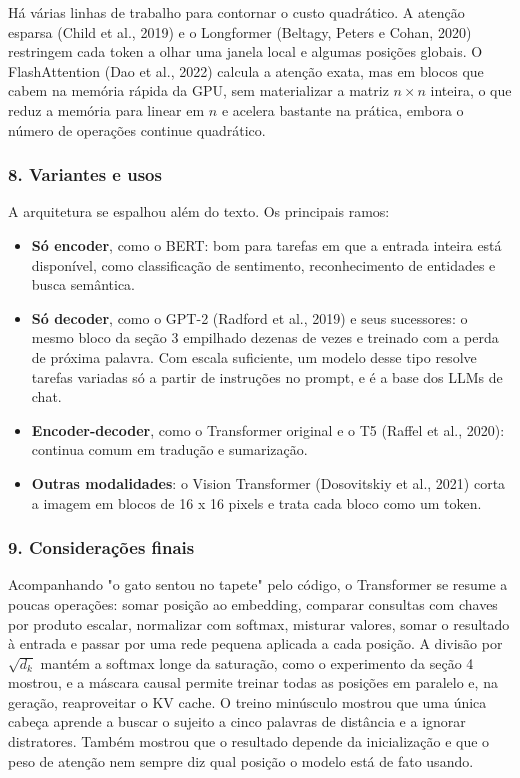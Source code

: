 \documentclass[12pt, a4paper]{article}
\providecommand{\tightlist}{%
  \setlength{\itemsep}{0pt}\setlength{\parskip}{0pt}}
\begin{document}
Há várias linhas de trabalho para contornar o custo quadrático. A atenção esparsa (Child et al., 2019) e o Longformer (Beltagy, Peters e Cohan, 2020) restringem cada token a olhar uma janela local e algumas posições globais. O FlashAttention (Dao et al., 2022) calcula a atenção exata, mas em blocos que cabem na memória rápida da GPU, sem materializar a matriz \(n \times n\) inteira, o que reduz a memória para linear em \(n\) e acelera bastante na prática, embora o número de operações continue quadrático.

\subsubsection{8. Variantes e usos}\label{8-variantes-e-usos}

A arquitetura se espalhou além do texto. Os principais ramos:

\begin{itemize}
\tightlist
\item
  \textbf{Só encoder}, como o BERT: bom para tarefas em que a entrada inteira está disponível, como classificação de sentimento, reconhecimento de entidades e busca semântica.
\item
  \textbf{Só decoder}, como o GPT-2 (Radford et al., 2019) e seus sucessores: o mesmo bloco da seção 3 empilhado dezenas de vezes e treinado com a perda de próxima palavra. Com escala suficiente, um modelo desse tipo resolve tarefas variadas só a partir de instruções no prompt, e é a base dos LLMs de chat.
\item
  \textbf{Encoder-decoder}, como o Transformer original e o T5 (Raffel et al., 2020): continua comum em tradução e sumarização.
\item
  \textbf{Outras modalidades}: o Vision Transformer (Dosovitskiy et al., 2021) corta a imagem em blocos de 16 x 16 pixels e trata cada bloco como um token.
\end{itemize}

\subsubsection{9. Considerações finais}\label{9-considerauxe7uxf5es-finais}

Acompanhando "o gato sentou no tapete" pelo código, o Transformer se resume a poucas operações: somar posição ao embedding, comparar consultas com chaves por produto escalar, normalizar com softmax, misturar valores, somar o resultado à entrada e passar por uma rede pequena aplicada a cada posição. A divisão por \(\sqrt{d_k}\) mantém a softmax longe da saturação, como o experimento da seção 4 mostrou, e a máscara causal permite treinar todas as posições em paralelo e, na geração, reaproveitar o KV cache. O treino minúsculo mostrou que uma única cabeça aprende a buscar o sujeito a cinco palavras de distância e a ignorar distratores. Também mostrou que o resultado depende da inicialização e que o peso de atenção nem sempre diz qual posição o modelo está de fato usando.
\end{document}
